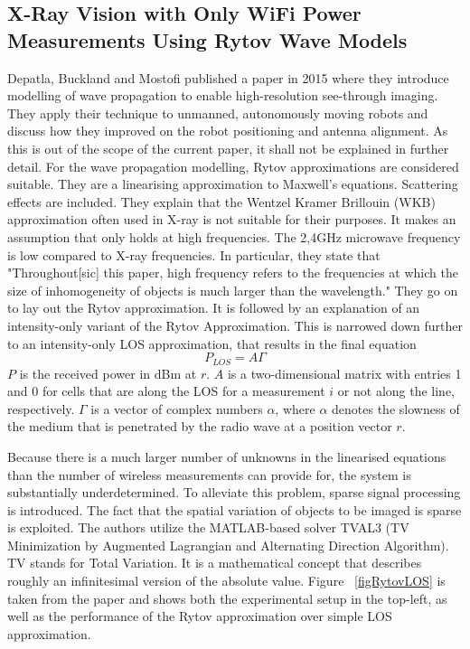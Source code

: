 \documentclass[conference]{IEEEtran}
\begin{document}
\subsection{X-Ray Vision with Only WiFi Power Measurements Using Rytov Wave Models}
Depatla, Buckland and Mostofi published a paper in 2015 \cite{DepatlaMostofi2015} where they introduce modelling of wave propagation to enable high-resolution see-through imaging. They apply their technique to unmanned, autonomously moving robots and discuss how they improved on the robot positioning and antenna alignment. As this is out of the scope of the current paper, it shall not be explained in further detail. For the wave propagation modelling, Rytov approximations are considered suitable. They are a linearising approximation to Maxwell's equations. Scattering effects are included. They explain that the Wentzel Kramer Brillouin (WKB) approximation often used in X-ray is not suitable for their purposes. It makes an assumption that only holds at high frequencies. The 2,4GHz microwave frequency is low compared to X-ray frequencies. In particular, they state that "Throughout[sic] this paper, high frequency refers to the frequencies at which the size of inhomogeneity of objects is much larger than the wavelength." They go on to lay out the Rytov approximation. It is followed by an explanation of an intensity-only variant of the Rytov Approximation. This is narrowed down further to an intensity-only LOS approximation, that results in the final equation $$P_{LOS} = A\Gamma$$
$P$ is the received power in dBm at $r$. $A$ is a two-dimensional matrix with entries 1 and 0 for cells that are along the LOS for a measurement $i$ or not along the line, respectively. $\Gamma$ is a vector of complex numbers $\alpha$, where $\alpha$ denotes the slowness of the medium that is penetrated by the radio wave at a position vector $r$.
\par
Because there is a much larger number of unknowns in the linearised equations than the number of wireless measurements can provide for, the system is substantially underdetermined. To alleviate this problem, sparse signal processing is introduced. The fact that the spatial variation of objects to be imaged is sparse is exploited. The authors utilize the MATLAB-based solver TVAL3 (TV Minimization by Augmented Lagrangian and Alternating Direction Algorithm). TV stands for Total Variation. It is a mathematical concept that describes roughly an infinitesimal version of the absolute value.
Figure ~\ref{figRytovLOS} is taken from the paper and shows both the experimental setup in the top-left, as well as the performance of the Rytov approximation over simple LOS approximation.
\end{document}
